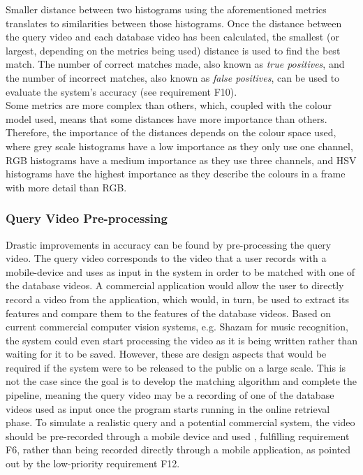 Smaller distance between two histograms using the aforementioned metrics translates to similarities between those histograms. Once the distance between the query video and each database video has been calculated, the smallest (or largest, depending on the metrics being used) distance is used to find the best match. The number of correct matches made, also known as \textit{true positives}, and the number of incorrect matches, also known as \textit{false positives}, can be used to evaluate the system's accuracy (see requirement F10).\\

Some metrics are more complex than others, which, coupled with the colour model used, means that some distances have more importance than others. Therefore, the importance of the distances depends on the colour space used, where grey scale histograms have a low importance as they only use one channel, RGB histograms have a medium importance as they use three channels, and HSV histograms have the highest importance as they describe the colours in a frame with more detail than RGB.


\subsubsection{Query Video Pre-processing}
\label{sec:design-query-video-processing}

Drastic improvements in accuracy can be found by pre-processing the query video. The query video corresponds to the video that a user records with a mobile-device and uses as input in the system in order to be matched with one of the database videos. A commercial application would allow the user to directly record a video from the application, which would, in turn, be used to extract its features and compare them to the features of the database videos. Based on current commercial computer vision systems, e.g. Shazam for music recognition, the system could even start processing the video as it is being written rather than waiting for it to be saved. However, these are design aspects that would be required if the system were to be released to the public on a large scale. This is not the case since the goal is to develop the matching algorithm and complete the pipeline, meaning the query video may be a recording of one of the database videos used as input once the program starts running in the online retrieval phase. To simulate a realistic query and a potential commercial system, the video should be pre-recorded through a mobile device and used , fulfilling requirement F6, rather than being recorded directly through a mobile application, as pointed out by the low-priority requirement F12.\\

